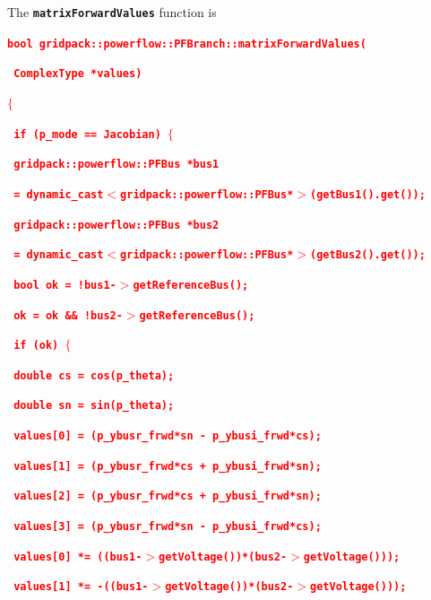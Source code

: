 \documentclass[12pt]{report} %
\begin{document}
The \texttt{\textbf{matrixForwardValues}} function is

\textcolor{red}{\texttt{\textbf{bool gridpack::powerflow::PFBranch::matrixForwardValues(}}}

\textcolor{red}{\texttt{\textbf{   ComplexType *values)}}}

\textcolor{red}{\texttt{\textbf{$\boldsymbol{\mathrm{\{}}$}}}

\textcolor{red}{\texttt{\textbf{  if (p\_mode == Jacobian) $\boldsymbol{\mathrm{\{}}$}}}

\textcolor{red}{\texttt{\textbf{    gridpack::powerflow::PFBus *bus1}}}

\textcolor{red}{\texttt{\textbf{      = dynamic\_cast$\boldsymbol{\mathrm{<}}$gridpack::powerflow::PFBus*$\boldsymbol{\mathrm{>}}$(getBus1().get());}}}

\textcolor{red}{\texttt{\textbf{    gridpack::powerflow::PFBus *bus2}}}

\textcolor{red}{\texttt{\textbf{      = dynamic\_cast$\boldsymbol{\mathrm{<}}$gridpack::powerflow::PFBus*$\boldsymbol{\mathrm{>}}$(getBus2().get());}}}

\textcolor{red}{\texttt{\textbf{    bool ok = !bus1-$\boldsymbol{\mathrm{>}}$getReferenceBus();}}}

\textcolor{red}{\texttt{\textbf{    ok = ok \&\& !bus2-$\boldsymbol{\mathrm{>}}$getReferenceBus();}}}

\textcolor{red}{\texttt{\textbf{    if (ok) $\boldsymbol{\mathrm{\{}}$}}}

\textcolor{red}{\texttt{\textbf{      double cs = cos(p\_theta);}}}

\textcolor{red}{\texttt{\textbf{      double sn = sin(p\_theta);}}}

\textcolor{red}{\texttt{\textbf{      values[0] = (p\_ybusr\_frwd*sn - p\_ybusi\_frwd*cs);}}}

\textcolor{red}{\texttt{\textbf{      values[1] = (p\_ybusr\_frwd*cs + p\_ybusi\_frwd*sn);}}}

\textcolor{red}{\texttt{\textbf{      values[2] = (p\_ybusr\_frwd*cs + p\_ybusi\_frwd*sn);}}}

\textcolor{red}{\texttt{\textbf{      values[3] = (p\_ybusr\_frwd*sn - p\_ybusi\_frwd*cs);}}}

\textcolor{red}{\texttt{\textbf{      values[0] *= ((bus1-$\boldsymbol{\mathrm{>}}$getVoltage())*(bus2-$\boldsymbol{\mathrm{>}}$getVoltage()));}}}

\textcolor{red}{\texttt{\textbf{      values[1] *= -((bus1-$\boldsymbol{\mathrm{>}}$getVoltage())*(bus2-$\boldsymbol{\mathrm{>}}$getVoltage()));}}}
\end{document}
